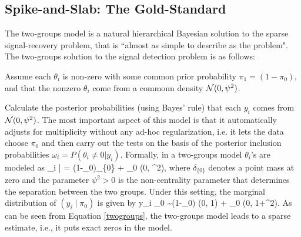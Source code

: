 \documentclass[11pt]{article}
\numberwithin{equation}{section}
\begin{document}

\subsection{Spike-and-Slab: The Gold-Standard}

The two-groups model is a natural hierarchical Bayesian solution to the sparse signal-recovery problem, that is ``almost as simple to describe as the problem".  The two-groups solution to the signal detection problem is as follows:
\ben
\item Assume each $\theta_i$ is non-zero with some common prior probability $\pi_1 = (1 - \pi_0)$, and that the nonzero $\theta_i$ come from a commonn density ${\cal N}(0,\psi^2)$. 
\item Calculate the posterior probabilities (using Bayes' rule) that each $y_i$ comes from ${\cal N}(0,\psi^2)$. 
\een
The most important aspect of this model is that it automatically adjusts for multiplicity without any ad-hoc regularization, i.e. it lets the data choose $\pi_0$ and then carry out the tests on the basis of the posterior inclusion probabilities $\omega_i = P(\theta_i \neq 0 | y_i)$. Formally, in a two-groups model $\theta_i$'s are modeled as
\beq
\theta_i | \mu = (1-\pi_0)\delta_{\{0\}} + \pi_0 \Nor (0, \psi^2), \label{spikeslab}
\eeq
where $\delta_{\{0\}}$ denotes a point mass at zero and the parameter $\psi^2>0$ is the non-centrality parameter that determines the separation between the two groups. Under this setting, the marginal distribution of $(y_i \mid \pi_0)$ is given by
\beq
y_i \mid \pi_0 \sim  (1-\pi_0) \Nor(0, 1) + \pi_0 \Nor(0, 1+\psi^2). \label{twogroups}
\eeq
As can be seen from Equation \eqref{twogroups}, the two-groups model leads to a sparse estimate, i.e., it puts exact zeros in the model. 
\end{document}
